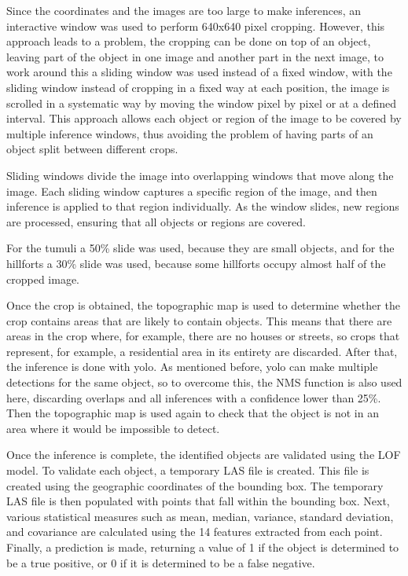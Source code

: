 Since the coordinates and the images are too large to make inferences, an interactive window was used to perform 640x640 pixel cropping. However, this approach leads to a problem, the cropping can be done on top of an object, leaving part of the object in one image and another part in the next image, to work around this a sliding window was used instead of a fixed window, with the sliding window instead of cropping in a fixed way at each position, the image is scrolled in a systematic way by moving the window pixel by pixel or at a defined interval. This approach allows each object or region of the image to be covered by multiple inference windows, thus avoiding the problem of having parts of an object split between different crops.

Sliding windows divide the image into overlapping windows that move along the image. Each sliding window captures a specific region of the image, and then inference is applied to that region individually. As the window slides, new regions are processed, ensuring that all objects or regions are covered.

For the tumuli a 50\% slide was used, because they are small objects, and for the hillforts a 30\% slide was used, because some hillforts occupy almost half of the cropped image.

Once the crop is obtained, the topographic map is used to determine whether the crop contains areas that are likely to contain objects. This means that there are areas in the crop where, for example, there are no houses or streets, so crops that represent, for example, a residential area in its entirety are discarded. After that, the inference is done with \ac{yolo}. As mentioned before, \ac{yolo} can make multiple detections for the same object, so to overcome this, the NMS function is also used here, discarding overlaps and all inferences with a confidence lower than 25\%. Then the topographic map is used again to check that the object is not in an area where it would be impossible to detect.

Once the inference is complete, the identified objects are validated using the LOF model. To validate each object, a temporary LAS file is created. This file is created using the geographic coordinates of the bounding box. The temporary LAS file is then populated with points that fall within the bounding box. Next, various statistical measures such as mean, median, variance, standard deviation, and covariance are calculated using the 14 features extracted from each point. Finally, a prediction is made, returning a value of 1 if the object is determined to be a true positive, or 0 if it is determined to be a false negative.

